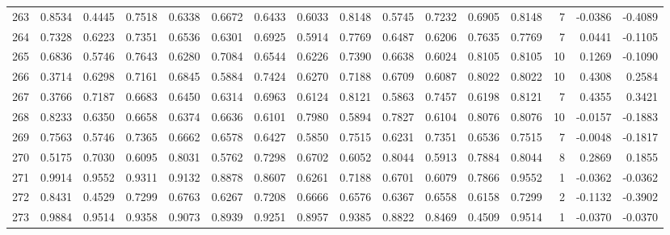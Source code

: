 \begin{tabular}{lrrrrrrrrrrrrrrr}
263 &      0.8534 &  0.4445 &  0.7518 &  0.6338 &  0.6672 &  0.6433 &  0.6033 &  0.8148 &  0.5745 &  0.7232 &   0.6905 &     0.8148 &      7 &                   -0.0386 &                    -0.4089 \\
264 &      0.7328 &  0.6223 &  0.7351 &  0.6536 &  0.6301 &  0.6925 &  0.5914 &  0.7769 &  0.6487 &  0.6206 &   0.7635 &     0.7769 &      7 &                    0.0441 &                    -0.1105 \\
265 &      0.6836 &  0.5746 &  0.7643 &  0.6280 &  0.7084 &  0.6544 &  0.6226 &  0.7390 &  0.6638 &  0.6024 &   0.8105 &     0.8105 &     10 &                    0.1269 &                    -0.1090 \\
266 &      0.3714 &  0.6298 &  0.7161 &  0.6845 &  0.5884 &  0.7424 &  0.6270 &  0.7188 &  0.6709 &  0.6087 &   0.8022 &     0.8022 &     10 &                    0.4308 &                     0.2584 \\
267 &      0.3766 &  0.7187 &  0.6683 &  0.6450 &  0.6314 &  0.6963 &  0.6124 &  0.8121 &  0.5863 &  0.7457 &   0.6198 &     0.8121 &      7 &                    0.4355 &                     0.3421 \\
268 &      0.8233 &  0.6350 &  0.6658 &  0.6374 &  0.6636 &  0.6101 &  0.7980 &  0.5894 &  0.7827 &  0.6104 &   0.8076 &     0.8076 &     10 &                   -0.0157 &                    -0.1883 \\
269 &      0.7563 &  0.5746 &  0.7365 &  0.6662 &  0.6578 &  0.6427 &  0.5850 &  0.7515 &  0.6231 &  0.7351 &   0.6536 &     0.7515 &      7 &                   -0.0048 &                    -0.1817 \\
270 &      0.5175 &  0.7030 &  0.6095 &  0.8031 &  0.5762 &  0.7298 &  0.6702 &  0.6052 &  0.8044 &  0.5913 &   0.7884 &     0.8044 &      8 &                    0.2869 &                     0.1855 \\
271 &      0.9914 &  0.9552 &  0.9311 &  0.9132 &  0.8878 &  0.8607 &  0.6261 &  0.7188 &  0.6701 &  0.6079 &   0.7866 &     0.9552 &      1 &                   -0.0362 &                    -0.0362 \\
272 &      0.8431 &  0.4529 &  0.7299 &  0.6763 &  0.6267 &  0.7208 &  0.6666 &  0.6576 &  0.6367 &  0.6558 &   0.6158 &     0.7299 &      2 &                   -0.1132 &                    -0.3902 \\
273 &      0.9884 &  0.9514 &  0.9358 &  0.9073 &  0.8939 &  0.9251 &  0.8957 &  0.9385 &  0.8822 &  0.8469 &   0.4509 &     0.9514 &      1 &                   -0.0370 &                    -0.0370 \\

\end{tabular}
